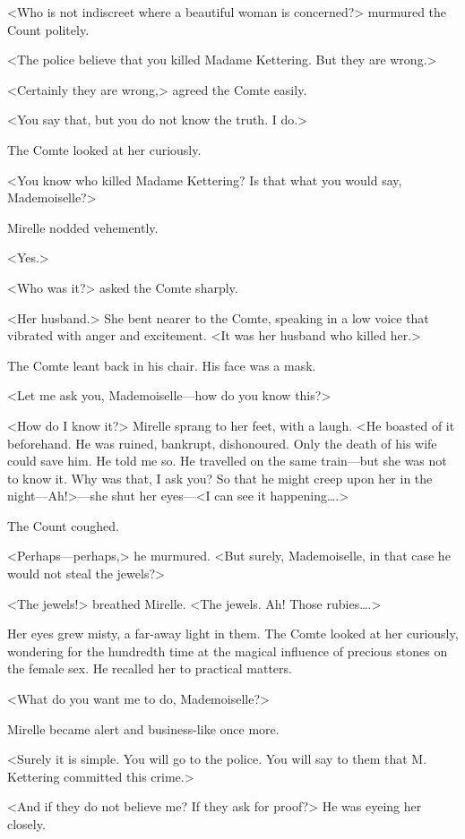 <Who is not indiscreet where a beautiful woman is concerned?> murmured the Count politely.

<The police believe that you killed Madame Kettering. But they are wrong.>

<Certainly they are wrong,> agreed the Comte easily.

<You say that, but you do not know the truth. I do.>

The Comte looked at her curiously.

<You know who killed Madame Kettering? Is that what you would say, Mademoiselle?>

Mirelle nodded vehemently.

<Yes.>

<Who was it?> asked the Comte sharply.

<Her husband.> She bent nearer to the Comte, speaking in a low voice that vibrated with anger and excitement. <It was her husband who killed her.>

The Comte leant back in his chair. His face was a mask.

<Let me ask you, Mademoiselle—how do you know this?>

<How do I know it?> Mirelle sprang to her feet, with a laugh. <He boasted of it beforehand. He was ruined, bankrupt, dishonoured. Only the death of his wife could save him. He told me so. He travelled on the same train—but she was not to know it. Why was that, I ask you? So that he might creep upon her in the night—Ah!>—she shut her eyes—<I can see it happening\dots.>

The Count coughed.

<Perhaps—perhaps,> he murmured. <But surely, Mademoiselle, in that case he would not steal the jewels?>

<The jewels!> breathed Mirelle. <The jewels. Ah! Those rubies\dots.>

Her eyes grew misty, a far-away light in them. The Comte looked at her curiously, wondering for the hundredth time at the magical influence of precious stones on the female sex. He recalled her to practical matters.

<What do you want me to do, Mademoiselle?>

Mirelle became alert and business-like once more.

<Surely it is simple. You will go to the police. You will say to them that M. Kettering committed this crime.>

<And if they do not believe me? If they ask for proof?> He was eyeing her closely.


